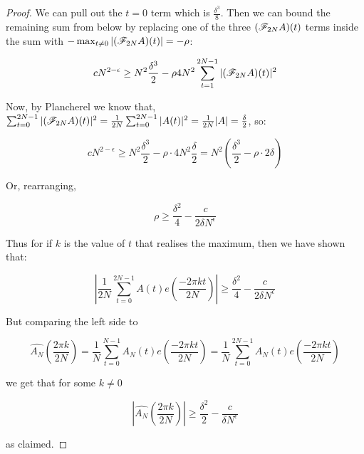 \documentclass{report}
\theoremstyle{remark}
\numberwithin{equation}{section}
\begin{document}
\begin{proof}
  We can pull out the $t = 0$ term which is $\frac{\delta^3}{8}$.  Then we can
  bound the remaining sum from below by replacing one of the three
  $(\mathscr{F}_{2N} A)(t)$ terms inside the sum with
  $-\max_{t\neq 0} |(\mathscr{F}_{2N} A)(t)| = -\rho$:
  
  \[cN^{2-\epsilon} \geq N^2 \frac{\delta^3}{2} - \rho 4 N^2 \sum_{t=1}^{2N-1} |(\mathscr{F}_{2N} A)(t)|^2\]

  Now, by Plancherel we know that,
  $\sum_{t=0}^{2N-1} |(\mathscr{F}_{2N}A)(t)|^2 = \frac{1}{2N}
  \sum_{t=0}^{2N-1} |A(t)|^2 = \frac{1}{2N} |A| = \frac{\delta}{2}$,
  so:

  \[cN^{2-\epsilon} \geq N^2 \frac{\delta^3}{2} - \rho \cdot 4N^2
    \frac{\delta}{2} = N^2\left(\frac{\delta^3}{2} - \rho\cdot 2
      \delta \right)\]

  Or, rearranging, 

  \[\rho \geq \frac{\delta^2}{4} - \frac{c}{2\delta N^\epsilon}\]

  Thus for if $k$ is the value of $t$ that realises the maximum, then we
  have shown that: 
  
  \[\left|\frac{1}{2N} \sum_{t=0}^{2N-1} A(t) e(\frac{-2\pi k
        t}{2N})\right| \geq \frac{\delta^2}{4} - \frac{c}{2\delta N^\epsilon}\]
  
  But comparing the left side to 
  
  \[\widehat{A_N}(\frac{2\pi k}{2N}) = \frac{1}{N}\sum_{t=0}^{N-1} A_N(t) e(\frac{-2\pi k
      t}{2N}) = \frac{1}{N}\sum_{t=0}^{2N-1} A_N(t) e(\frac{-2\pi k
      t}{2N})\]
  
  we get that for some $k \neq 0$

  \[|\widehat{A_N}(\frac{2\pi k}{2N})| \geq \frac{\delta^2}{2} - \frac{c}{\delta
      N^\epsilon}\]

  as claimed.
\end{proof}
\end{document}
